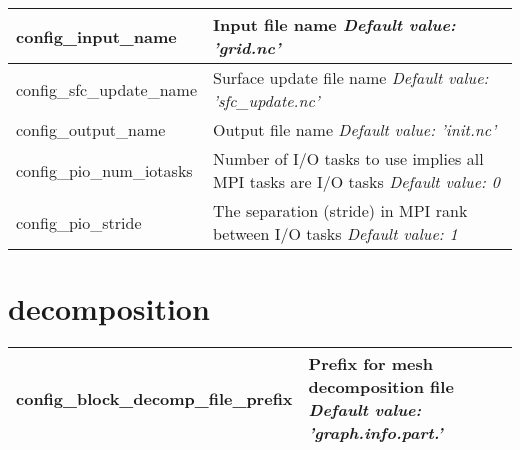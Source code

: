 {\small
\begin{longtable}{|p{1.75in} |p{4.5in}|}
 \hline
   config\_input\_name         & Input file name \newline 
   {\em Default value: 'grid.nc'} \\ \hline
   
   config\_sfc\_update\_name        & Surface update file name \newline 
   {\em Default value: 'sfc\_update.nc'} \\ \hline   
 
   config\_output\_name        & Output file name \newline 
   {\em Default value: 'init.nc'} \\ \hline

   config\_pio\_num\_iotasks        & Number of I/O tasks to use \hfill\break 0 implies all MPI tasks are I/O tasks \newline 
   {\em Default value: 0} \\ \hline

   config\_pio\_stride        & The separation (stride) in MPI rank between I/O tasks \newline 
   {\em Default value: 1} \\ \hline
   
\end{longtable}
}

\section{decomposition}

{\small
\begin{longtable}{|p{1.75in} |p{4.5in}|}
 \hline
   config\_block\_decomp\_file\_prefix & Prefix for mesh decomposition file \newline 
   {\em Default value: 'graph.info.part.'}  \\ \hline

\end{longtable}
}

